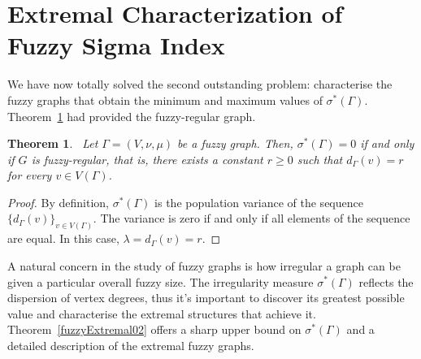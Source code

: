\documentclass[12pt]{amsart}
\newtheorem{theorem}{Theorem}[section]
\newcommand{\SFG}{\sigma^*(\Gamma)}
\begin{document}
\section{Extremal Characterization of Fuzzy Sigma Index}
We have now totally solved the second outstanding problem: characterise the fuzzy graphs that obtain the minimum and maximum values of $\SFG$. Theorem~\ref{fuzzyExtremal01} had provided  the fuzzy-regular graph.

\begin{theorem}~\label{fuzzyExtremal01}
Let $\Gamma=(V, \nu,\mu)$ be a fuzzy graph. Then, $\SFG=0$ if and only if $G$ is fuzzy-regular, that is, there exists a constant $r \ge 0$ such that $d_\Gamma(v)=r$ for every $v \in V(\Gamma)$. 
\end{theorem}
\begin{proof}
By definition, $\SFG$ is the population variance of the sequence $\{d_\Gamma(v)\}_{v \in V(\Gamma)}$. The variance is zero if and only if all elements of the sequence are equal. In this case, $\lambda=d_\Gamma(v)=r$. 
\end{proof}

A natural concern in the study of fuzzy graphs is how irregular a graph can be given a particular overall fuzzy size. The irregularity measure $\SFG$ reflects the dispersion of vertex degrees, thus it's important to discover its greatest possible value and characterise the extremal structures that achieve it. Theorem~\ref{fuzzyExtremal02} offers a sharp upper bound on $\SFG$ and a detailed description of the extremal fuzzy graphs.
\end{document}
